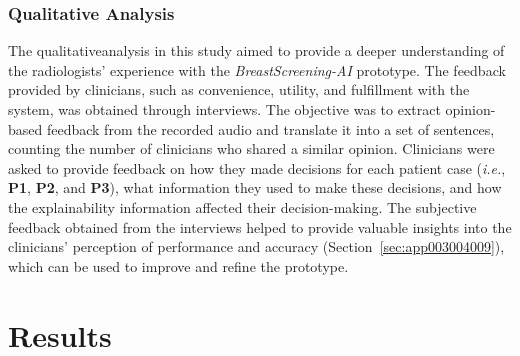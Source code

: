 \subsubsection{Qualitative Analysis}
\label{sec:chap005005004002}

The qualitative\footnotemark[14] analysis in this study aimed to provide a deeper understanding of the radiologists' experience with the {\it BreastScreening-AI} prototype.
The feedback provided by clinicians, such as convenience, utility, and fulfillment with the system, was obtained through interviews.
The objective was to extract opinion-based feedback from the recorded audio and translate it into a set of sentences, counting the number of clinicians who shared a similar opinion.
Clinicians were asked to provide feedback on how they made decisions for each patient case ({\it i.e.}, {\bf P1}, {\bf P2}, and {\bf P3}), what information they used to make these decisions, and how the explainability information affected their decision-making.
The subjective feedback obtained from the interviews helped to provide valuable insights into the clinicians' perception of performance and accuracy (Section~\ref{sec:app003004009}), which can be used to improve and refine the prototype.


\section{Results}
\label{sec:chap005006}

